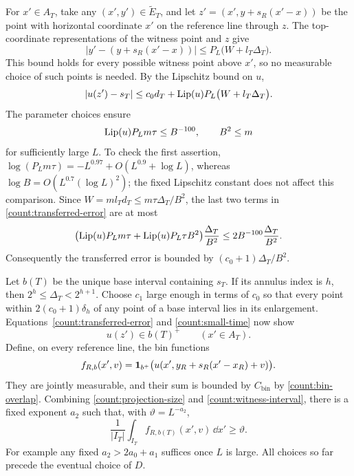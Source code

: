 For $x'\in A_T$, take any $(x',y')\in\widetilde E_T$, and let
$z'=(x',y+s_R(x'-x))$ be the point with horizontal coordinate
$x'$ on the reference line through $z$.  The top-coordinate
representations of the witness point and $z$ give
\begin{equation}\label{count:vertical-distance}
 |y'-(y+s_R(x'-x))|
 \leq P_L\bigl(W+l_T\Delta_T\bigr).
\end{equation}
This bound holds for every possible witness point above $x'$,
so no measurable choice of such points is needed.  By the
Lipschitz bound on $u$,
\begin{equation}\label{count:transferred-error}
 |u(z')-s_T|
 \leq c_0d_T+\operatorname{Lip}(u)P_L\bigl(W+l_T\Delta_T\bigr).
\end{equation}
The parameter choices ensure
\begin{equation}\label{count:small-time}
 \operatorname{Lip}(u)P_Lm\tau\leq B^{-100},\qquad B^2\leq m
\end{equation}
for sufficiently large $L$.  To check the first assertion,
$\log(P_Lm\tau)= -L^{0.97}+O(L^{0.9}+\log L)$, whereas
$\log B=O(L^{0.7}(\log L)^2)$; the fixed Lipschitz constant
does not affect this comparison.  Since
$W=ml_Td_T\leq m\tau\Delta_T/B^2$, the last two terms in
\eqref{count:transferred-error} are at most
\[
 \bigl(\operatorname{Lip}(u)P_Lm\tau+
       \operatorname{Lip}(u)P_L\tau B^2\bigr)\frac{\Delta_T}{B^2}
 \leq 2B^{-100}\frac{\Delta_T}{B^2}.
\]
Consequently the transferred error is bounded by
$(c_0+1)\Delta_T/B^2$.

Let $b(T)$ be the unique base interval containing $s_T$.  If its
annulus index is $h$, then $2^h\leq\Delta_T<2^{h+1}$.
Choose $c_1$ large enough in terms of $c_0$ so that every point
within $2(c_0+1)\delta_h$ of any point of a base interval lies
in its enlargement.  Equations~\eqref{count:transferred-error}
and \eqref{count:small-time} now show
\[
 u(z')\in b(T)^+\qquad(x'\in A_T).
\]
Define, on every reference line, the bin functions
\begin{equation}\label{count:line-bin-functions}
 f_{R,b}(x',v)=
 \mathbf 1_{b^+}\bigl(u(x',y_R+s_R(x'-x_R)+v)\bigr).
\end{equation}
They are jointly measurable, and their sum is bounded by
$C_{\mathrm{bin}}$ by \eqref{count:bin-overlap}.
Combining \eqref{count:projection-size} and
\eqref{count:witness-interval}, there is a fixed exponent $a_2$
such that, with $\vartheta=L^{-a_2}$,
\begin{equation}\label{count:popular-line-bin}
 \frac1{|I_T|}\int_{I_T} f_{R,b(T)}(x',v)\,\dd x'
 \geq\vartheta.
\end{equation}
For example any fixed $a_2>2a_0+a_1$ suffices once $L$ is large.
All choices so far precede the eventual choice of $D$.

